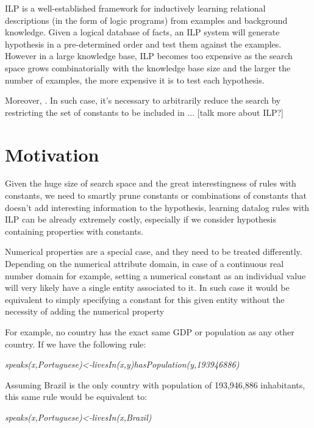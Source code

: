 
ILP is a well-established framework for inductively learning relational descriptions (in the form of logic programs)
from examples and background knowledge. Given a logical database of facts, an ILP system will generate hypothesis in a
pre-determined order and test them against the examples. However in a large knowledge base, ILP becomes too expensive as
the search space grows combinatorially with the knowledge base size and the larger the number of examples, the more
expensive it is to test each hypothesis.

Moreover, . In such case, it's necessary to arbitrarily reduce the
search by restricting the set of constants to be included in ... [talk more about ILP?]

\section{Motivation}
Given the huge size of search space and the great interestingness of rules with constants, we need to smartly prune
constants or combinations of constants that doesn't add interesting information to the hypothesis, learning datalog
rules with ILP can be already extremely costly, especially if we consider hypothesis containing properties with
constants.

Numerical properties are a special case, and they need to be treated differently. Depending on the numerical attribute
domain, in case of a continuous real number domain for example, setting a numerical constant as an individual value will
very likely have a single entity associated to it. In such case it would be equivalent to simply specifying a constant for this given entity without the necessity of adding the numerical property

For example, no country has the exact same GDP or population as any other country. If we have the following rule:

\begin{center}
 \emph{speaks(x,Portuguese)<-livesIn(x,y)hasPopulation(y,193946886)}
\end{center}

Assuming Brazil is the only country with population of 193,946,886 inhabitants, this same rule would be equivalent to:

\begin{center}
 \emph{speaks(x,Portuguese)<-livesIn(x,Brazil)}
\end{center}

